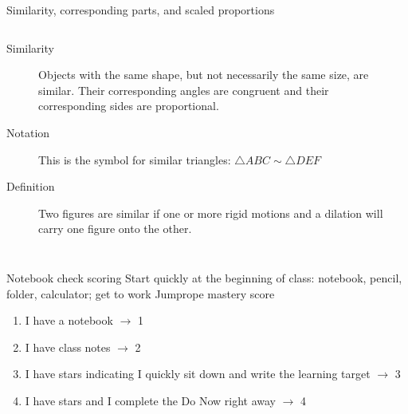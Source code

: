 \begin{frame}{Similarity, corresponding parts, and scaled proportions}
  \begin{columns}
      \begin{description}
        \item[Similarity] Objects with the same shape, but not necessarily the same size, are similar. Their corresponding angles are congruent and their corresponding sides are proportional.
        \item[Notation] This is the symbol for similar triangles: $\triangle ABC \sim \triangle DEF$
        \item[Definition] Two figures are similar if one or more rigid motions and a dilation will carry one figure onto the other.
      \end{description}
    \begin{flushright}
    \end{flushright}
  \end{columns}
\end{frame}

\begin{frame}{Notebook check scoring}
  {Start quickly at the beginning of class: notebook, pencil, folder, calculator; get to work}
    Jumprope mastery score
    \begin{enumerate}
      \item I have a notebook $\rightarrow$ 1
      \item I have class notes $\rightarrow$ 2
      \item I have stars indicating I quickly sit down and write the learning target $\rightarrow$ 3
      \item I have stars and I complete the Do Now right away $\rightarrow$ 4
    \end{enumerate} \bigskip
\end{frame}

